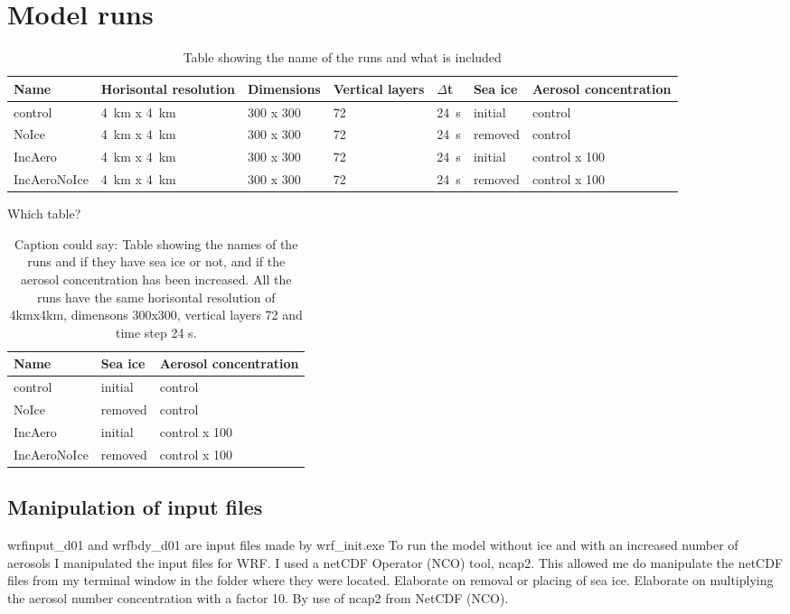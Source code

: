 \section{Model runs}
\begin{table}[H]
\centering
\caption{Table showing the name of the runs and what is included}
\label{tab:runs} 
\begin{tabular}{L{2.3cm} L{2.3cm} L{2cm} L{1.5cm} L{1cm} L{1.5cm} L{3cm}}
\centering
Name & Horisontal resolution & Dimensions & Vertical layers & $\Delta$t & Sea ice & Aerosol concentration\\ \hline
control & 4~km x 4~km & 300 x 300 & 72& 24~s & initial & control \\
NoIce & 4~km x 4~km & 300 x 300 & 72 & 24~s & removed & control \\
IncAero & 4~km x 4~km & 300 x 300 & 72 & 24~s & initial & control x 100 \\
IncAeroNoIce & 4~km x 4~km & 300 x 300 & 72 & 24~s & removed & control x 100 \\
\end{tabular}
\end{table}

Which table?

\begin{table}[H]
\centering
\caption{Caption could say: Table showing the names of the runs and if they have sea ice or not, and if the aerosol concentration has been increased. All the runs have the same horisontal resolution of 4kmx4km, dimensons 300x300, vertical layers 72 and time step 24 s.}
\label{tab:runs} 
\begin{tabular}{L{2.3cm} L{2cm} L{3cm}}
\centering
Name & Sea ice & Aerosol concentration\\ \hline
control & initial & control \\
NoIce & removed & control \\
IncAero & initial & control x 100 \\
IncAeroNoIce & removed & control x 100 \\
\end{tabular}
\end{table}

\subsection{Manipulation of input files}
wrfinput_d01 and wrfbdy_d01 are input files made by wrf_init.exe
To run the model without ice and with an increased number of aerosols I manipulated the input files for WRF. I used a netCDF Operator (NCO) tool, ncap2. This allowed me do manipulate the netCDF files from my terminal window in the folder where they were located.
Elaborate on removal or placing of sea ice. Elaborate on multiplying the aerosol number concentration with a factor 10. By use of ncap2 from NetCDF (NCO).

